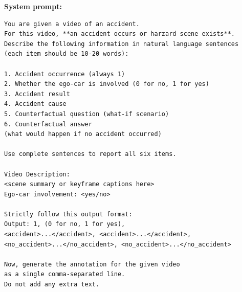 \documentclass{article}
\begin{document}
\begin{tcolorbox}[title=description and counterfactual Q\&A generation  for accident video, breakable]
\small
\textbf{System prompt:}
\begin{verbatim}
You are given a video of an accident. 
For this video, **an accident occurs or harzard scene exists**. 
Describe the following information in natural language sentences 
(each item should be 10-20 words):

1. Accident occurrence (always 1)
2. Whether the ego-car is involved (0 for no, 1 for yes)
3. Accident result
4. Accident cause
5. Counterfactual question (what-if scenario)
6. Counterfactual answer 
(what would happen if no accident occurred)

Use complete sentences to report all six items.

Video Description:
<scene summary or keyframe captions here>
Ego-car involvement: <yes/no>

Strictly follow this output format:
Output: 1, (0 for no, 1 for yes), 
<accident>...</accident>, <accident>...</accident>, 
<no_accident>...</no_accident>, <no_accident>...</no_accident>

Now, generate the annotation for the given video 
as a single comma-separated line. 
Do not add any extra text.
\end{verbatim}
\end{tcolorbox}
\end{document}
